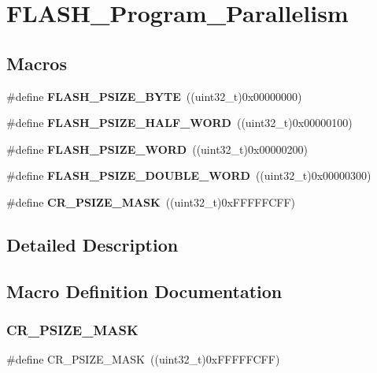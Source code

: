 \section{F\+L\+A\+S\+H\+\_\+\+Program\+\_\+\+Parallelism}
\label{group__FLASH__Program__Parallelism}
\subsection*{Macros}
\begin{DoxyCompactItemize}
\item 
\#define \textbf{ F\+L\+A\+S\+H\+\_\+\+P\+S\+I\+Z\+E\+\_\+\+B\+Y\+TE}~((uint32\+\_\+t)0x00000000)
\item 
\#define \textbf{ F\+L\+A\+S\+H\+\_\+\+P\+S\+I\+Z\+E\+\_\+\+H\+A\+L\+F\+\_\+\+W\+O\+RD}~((uint32\+\_\+t)0x00000100)
\item 
\#define \textbf{ F\+L\+A\+S\+H\+\_\+\+P\+S\+I\+Z\+E\+\_\+\+W\+O\+RD}~((uint32\+\_\+t)0x00000200)
\item 
\#define \textbf{ F\+L\+A\+S\+H\+\_\+\+P\+S\+I\+Z\+E\+\_\+\+D\+O\+U\+B\+L\+E\+\_\+\+W\+O\+RD}~((uint32\+\_\+t)0x00000300)
\item 
\#define \textbf{ C\+R\+\_\+\+P\+S\+I\+Z\+E\+\_\+\+M\+A\+SK}~((uint32\+\_\+t)0x\+F\+F\+F\+F\+F\+C\+F\+F)
\end{DoxyCompactItemize}


\subsection{Detailed Description}


\subsection{Macro Definition Documentation}
\mbox{\label{group__FLASH__Program__Parallelism_ga7c755f15e36221021a1438857e40365c}} 
\subsubsection{C\+R\+\_\+\+P\+S\+I\+Z\+E\+\_\+\+M\+A\+SK}
{\footnotesize\ttfamily \#define C\+R\+\_\+\+P\+S\+I\+Z\+E\+\_\+\+M\+A\+SK~((uint32\+\_\+t)0x\+F\+F\+F\+F\+F\+C\+F\+F)}



